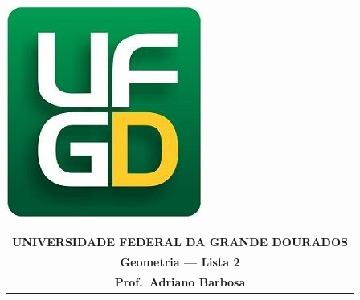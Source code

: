 \documentclass[a4paper,5pt]{amsbook}
\begin{document}
\thispagestyle{empty}
\pagestyle{empty}
\begin{minipage}[h]{0.14\textwidth}
	\includegraphics[scale=0.24]{../../ufgd.png}
\end{minipage}
\begin{minipage}[h]{\textwidth}
\begin{tabular}{c}
{{\bf UNIVERSIDADE FEDERAL DA GRANDE DOURADOS}}\\
{{\bf Geometria --- Lista 2}}\\
{{\bf Prof.\ Adriano Barbosa}}\\
\end{tabular}
\vspace{-0.45cm}
%
\end{minipage}

\end{document}
